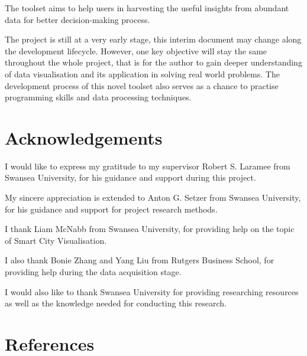 \documentclass[11pt,a4paper]{article}
\begin{document}
The toolset aims to help users in harvesting the useful insights from abundant data for better decision-making process.

The project is still at a very early stage, this interim document may change along the development lifecycle. However, one key objective will stay the same throughout the whole project, that is for the author to gain deeper understanding of data visualisation and its application in solving real world problems. The development process of this novel toolset also serves as a chance to practise programming skills and data processing techniques.

\section{Acknowledgements}
I would like to express my gratitude to my supervisor Robert S. Laramee from Swansea University, for his guidance and support during this project.

My sincere appreciation is extended to Anton G. Setzer from Swansea University, for his guidance and support for project research methods.

I thank Liam McNabb from Swansea University, for providing help on the topic of Smart City Visualisation. 

I also thank Bonie Zhang and Yang Liu from Rutgers Business School, for providing help during the data acquisition stage.

I would also like to thank Swansea University for providing researching resources as well as the knowledge needed for conducting this research.


\cleardoublepage
\begingroup
\sloppy
\section{References}
\printbibliography[heading=none]
\endgroup
\end{document}
